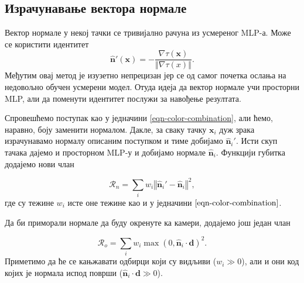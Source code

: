 \documentclass[12pt, a4paper, twoside]{book}
\numberwithin{equation}{chapter}
\numberwithin{theorem}{section}
\numberwithin{definition}{section}
\numberwithin{definitionChapter}{chapter}
\begin{document}
\subsection{Израчунавање вектора нормале}
Вектор нормале у некој тачки се тривијално рачуна из усмереног MLP-а. Може се користити идентитет
	\begin{equation}
		\hat{\textbf{n}}'(\textbf{x}) = -\frac{\nabla\tau(\textbf{x})}{\left\Vert\nabla\tau(x)\right\Vert}.
	\end{equation}
Међутим овај метод је изузетно непрецизан јер се од самог почетка ослања на недовољно обучен усмерени модел.
Отуда идеја да вектор нормале учи просторни MLP, али да поменути идентитет послужи за навођење резултата.

Спровешћемо поступак као у једначини \ref{eqn-color-combination}, али ћемо, наравно, боју заменити нормалом.
Дакле, за сваку тачку $\mathbf{x}_i$ дуж зрака израчунавамо нормалу описаним поступком и тиме добијамо $\hat{\mathbf{n}}_i'$.
Исти скуп тачака дајемо и просторном MLP-у и добијамо нормале $\hat{\mathbf{n}}_i$. Функцији губитка додајемо нови члан

	\begin{equation}
		\mathcal{R}_n = \sum_i w_i \left\Vert \hat{\mathbf{n}}_i' - \hat{\mathbf{n}}_i \right\Vert^2,
	\end{equation}
где су тежине $w_i$ исте оне тежине као и у једначини $\ref{eqn-color-combination}$.

Да би приморали нормале да буду окренуте ка камери, додајемо још један члан

	\begin{equation}
		\mathcal{R}_o = \sum_i w_i \max(0, \hat{\mathbf{n}}_i \cdot \mathbf{d})^2.
	\end{equation}
Приметимо да ће се кањжавати одбирци који су видљиви ($w_i \gg 0$), али и они код којих
је нормала испод површи ($\hat{\mathbf{n}}_i \cdot \mathbf{d} \gg 0$).
\end{document}
